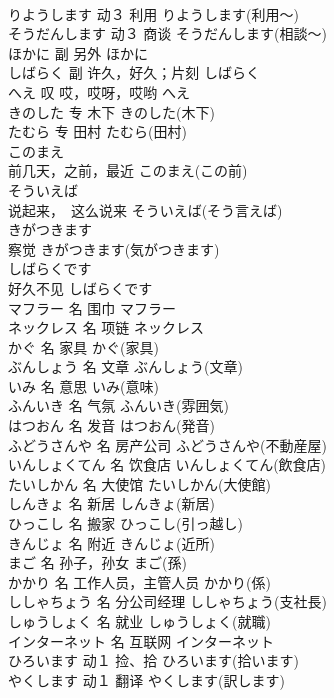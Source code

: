 \documentclass[8pt]{extreport}
\begin{document}
\begin{CJK}{UTF8}{min}
\\	りようします	动３	利用	りようします(利用～)	
\\	そうだんします	动３	商谈	そうだんします(相談～)	
\\	ほかに	副	另外	ほかに	
\\	しばらく	副	许久，好久；片刻	しばらく	
\\	へえ	叹	哎，哎呀，哎哟	へえ	
\\	きのした	专	木下	きのした(木下)	
\\	たむら	专	田村	たむら(田村)	
\\	このまえ	
\\	前几天，之前，最近	このまえ(この前)	
\\	そういえば	
\\	说起来，　这么说来	そういえば(そう言えば)	
\\	きがつきます	
\\	察觉	きがつきます(気がつきます)	
\\	しばらくです	
\\	好久不见	しばらくです	
\\	マフラー	名	围巾	マフラー	
\\	ネックレス	名	项链	ネックレス	
\\	かぐ	名	家具	かぐ(家具)	
\\	ぶんしょう	名	文章	ぶんしょう(文章)	
\\	いみ	名	意思	いみ(意味)	
\\	ふんいき	名	气氛	ふんいき(雰囲気)	
\\	はつおん	名	发音	はつおん(発音)	
\\	ふどうさんや	名	房产公司	ふどうさんや(不動産屋)	
\\	いんしょくてん	名	饮食店	いんしょくてん(飲食店)	
\\	たいしかん	名	大使馆	たいしかん(大使館)	
\\	しんきょ	名	新居	しんきょ(新居)	
\\	ひっこし	名	搬家	ひっこし(引っ越し)	
\\	きんじょ	名	附近	きんじょ(近所)	
\\	まご	名	孙子，孙女	まご(孫)	
\\	かかり	名	工作人员，主管人员	かかり(係)	
\\	ししゃちょう	名	分公司经理	ししゃちょう(支社長)	
\\	しゅうしょく	名	就业	しゅうしょく(就職)	
\\	インターネット	名	互联网	インターネット	
\\	ひろいます	动１	捡、拾	ひろいます(拾います)	
\\	やくします	动１	翻译	やくします(訳します)	

\end{CJK}
\end{document}
